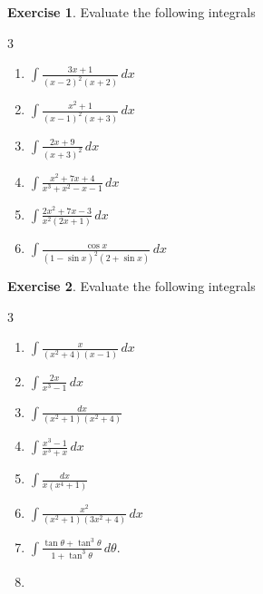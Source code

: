 \documentclass{book}
\theoremstyle{definition}
\newtheorem{exercise}{Exercise}[section]
\begin{document}
\begin{exercise}
Evaluate the following integrals
\begin{multicols}{3}
\begin{enumerate}[label=(\roman*)]
    \item $\displaystyle\int \frac{3x+1}{(x-2)^2(x+2)}\,dx$
    \item $\displaystyle\int\frac{x^2+1}{(x-1)^2(x+3)}\,dx$
    \item $\displaystyle\int\frac{2x+9}{(x+3)^2}\,dx$
    \item $\displaystyle\int\frac{x^2+7x+4}{x^3+x^2-x-1}\,dx$
    \item $\displaystyle\int\frac{2x^2+7x-3}{x^2(2x+1)}\,dx$
    \item $\displaystyle\int\frac{\cos x}{(1-\sin x)^2(2+\sin x)}\,dx$

\end{enumerate}
\end{multicols}    
\end{exercise}

\begin{exercise}
Evaluate the following integrals
\begin{multicols}{3}
\begin{enumerate}[label=(\roman*)]
    \item $\displaystyle\int \frac{x}{(x^2+4)(x-1)}\,dx$
    \item $\displaystyle\int\frac{2x}{x^3-1}\,dx$
    \item $\displaystyle\int\frac{dx}{(x^2+1)(x^2+4)}$
    \item $\displaystyle\int\frac{x^3-1}{x^3+x}\,dx$
    \item $\displaystyle\int\frac{dx}{x(x^4+1)}$
    \item $\displaystyle\int\frac{x^2}{(x^2+1)(3x^2+4)}\,dx$
    \item $\displaystyle\int\frac{\tan \theta+\tan^3\theta}{1+\tan^3\theta}\,d\theta$.
    \item[] \phantom{x}



\end{enumerate}
\end{multicols}    
\end{exercise}
\end{document}
